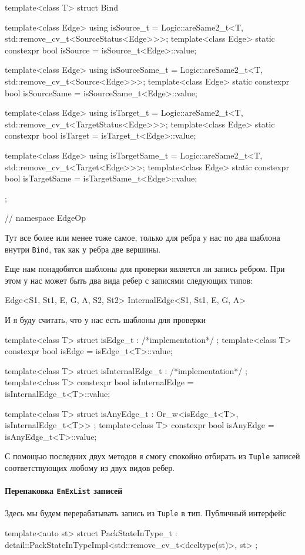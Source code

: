 \documentclass{article}
\begin{document}
{\begin{cppcode}
{template<class T>
struct Bind {
  template<class Edge>
  using isSource_t = Logic::areSame2_t<T, std::remove_cv_t<SourceStatus<Edge>>>;
  template<class Edge>
  static constexpr bool isSource = isSource_t<Edge>::value;

  template<class Edge>
  using isSourceSame_t = Logic::areSame2_t<T, std::remove_cv_t<Source<Edge>>>;
  template<class Edge>
  static constexpr bool isSourceSame = isSourceSame_t<Edge>::value;

  template<class Edge>
  using isTarget_t = Logic::areSame2_t<T, std::remove_cv_t<TargetStatus<Edge>>>;
  template<class Edge>
  static constexpr bool isTarget = isTarget_t<Edge>::value;

  template<class Edge>
  using isTargetSame_t = Logic::areSame2_t<T, std::remove_cv_t<Target<Edge>>>;
  template<class Edge>
  static constexpr bool isTargetSame = isTargetSame_t<Edge>::value;
};
} // namespace EdgeOp
\end{cppcode}
Тут все более или менее тоже самое, только для ребра у нас по два шаблона внутри \verb"Bind", так как у ребра две вершины.

Еще нам понадобятся шаблоны для проверки является ли запись ребром.
При этом у нас может быть два вида ребер с записями следующих типов:
\begin{cppcode}[\nonumbers]
Edge<S1, St1, E, G, A, S2, St2>
InternalEdge<S1, St1, E, G, A>
\end{cppcode}
И я буду считать, что у нас есть шаблоны для проверки
\begin{cppcode}
template<class T>
struct isEdge_t : /*implementation*/ {};
template<class T>
constexpr bool isEdge = isEdge_t<T>::value;

template<class T>
struct isInternalEdge_t : /*implementation*/ {};
template<class T>
constexpr bool isInternalEdge = isInternalEdge_t<T>::value;

template<class T>
struct isAnyEdge_t : Or_w<isEdge_t<T>, isInternalEdge_t<T>> {};
template<class T>
constexpr bool isAnyEdge = isAnyEdge_t<T>::value;
\end{cppcode}
С помощью последних двух методов я смогу спокойно отбирать из \verb"Tuple" записей соответствующих любому из двух видов ребер.

\paragraph{Перепаковка \texttt{EnExList} записей}

Здесь мы будем перерабатывать запись из \verb"Tuple" в тип.
Публичный интерфейс
\begin{cppcode}
template<auto st>
struct PackStateInType_t
    : detail::PackStateInTypeImpl<std::remove_cv_t<decltype(st)>, st> {};


\end{cppcode}}
\end{document}
